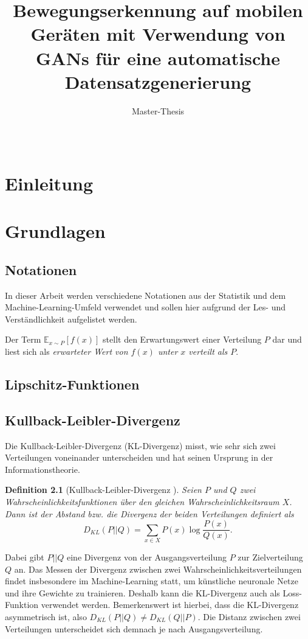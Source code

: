 \documentclass{hsflensburg}
\title{Bewegungserkennung auf mobilen Geräten mit Verwendung von GANs für eine automatische Datensatzgenerierung}
\subtitle{Master-Thesis}
\author{
  \name{Florian Hansen}\\
  \institution{Hochschule Flensburg}
}
\newtheorem{definition}{Definition}
\begin{document}
  \maketitle
  \tableofcontents

  \chapter{Einleitung}

  \chapter{Grundlagen}
  \section{Notationen}
  In dieser Arbeit werden verschiedene Notationen aus der Statistik und dem
  Machine-Learning-Umfeld verwendet und sollen hier aufgrund der Les- und
  Verständlichkeit aufgelistet werden.

  Der Term $\mathbb{E}_{x \sim P}\left[f(x)\right]$ stellt den Erwartungswert
  einer Verteilung $P$ dar und liest sich als \textit{erwarteter Wert von
  $f(x)$ unter $x$ verteilt als $P$}.

  \section{Lipschitz-Funktionen}

  \section{Kullback-Leibler-Divergenz}
  Die Kullback-Leibler-Divergenz (KL-Divergenz) misst, wie sehr sich zwei
  Verteilungen voneinander unterscheiden und hat seinen Ursprung in der
  Informationstheorie. 
  \begin{definition}[Kullback-Leibler-Divergenz \cite{arjovsky2017wasserstein}]
    Seien $P$ und $Q$ zwei Wahrscheinlichkeitsfunktionen über den gleichen
    Wahrscheinlichkeitsraum $X$. Dann ist der Abstand bzw. die Divergenz der
    beiden Verteilungen definiert als
    \[
      D_{KL}(P \lvert\lvert Q) = \sum_{x \in X} P(x) \log \frac{P(x)}{Q(x)}.
    \]
  \end{definition}
  Dabei gibt $P \lvert\lvert Q$ eine Divergenz von der Ausgangsverteilung $P$
  zur Zielverteilung $Q$ an. Das Messen der Divergenz zwischen zwei
  Wahrscheinlichkeitsverteilungen findet insbesondere im Machine-Learning statt,
  um künstliche neuronale Netze und ihre Gewichte zu trainieren. Deshalb kann
  die KL-Divergenz auch als Loss-Funktion verwendet werden. Bemerkenswert ist
  hierbei, dass die KL-Divergenz asymmetrisch ist, also $D_{KL}(P \lvert\lvert
  Q) \neq D_{KL}(Q \lvert\lvert P)$. Die Distanz zwischen zwei Verteilungen
  unterscheidet sich demnach je nach Ausgangsverteilung.
\end{document}
